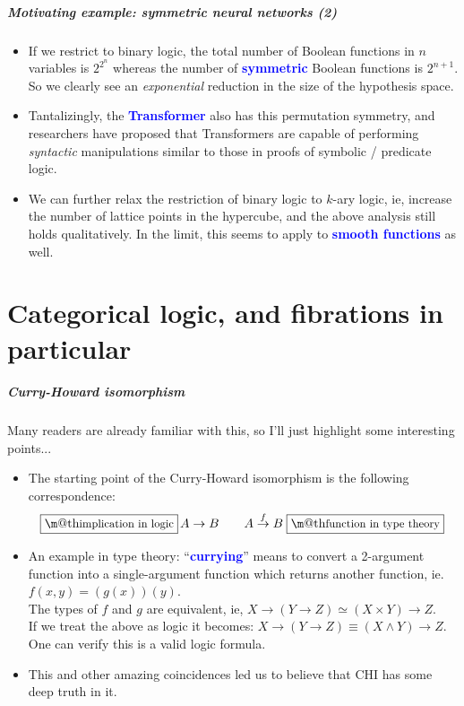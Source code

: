 \documentclass[16pt]{beamer}
\makeatletter
\let\oldtextbf\textbf
\renewcommand{\textbf}[1]{\textcolor{blue}{\oldtextbf{#1}}}
\renewcommand{\boxed}[1]{\fbox{\m@th$\displaystyle\scalebox{0.9}{#1}$} \,}
\makeatother
\begin{document}
\begin{frame}
	\frametitle{Motivating example: symmetric neural networks (2)}
	\begin{itemize}
		\item If we restrict to binary logic, the total number of Boolean functions in $n$ variables is $2^{2^n}$ whereas the number of \textbf{symmetric} Boolean functions is $2^{n+1}$.  So we clearly see an \textit{exponential} reduction in the size of the hypothesis space.
		
		\item Tantalizingly, the \textbf{Transformer} also has this permutation symmetry, and researchers have proposed that Transformers are capable of performing \textit{syntactic} manipulations similar to those in proofs of symbolic / predicate logic.
		
		\item We can further relax the restriction of binary logic to $k$-ary logic, ie, increase the number of lattice points in the hypercube, and the above analysis still holds qualitatively.  In the limit, this seems to apply to \textbf{smooth functions} as well.
	\end{itemize}
\end{frame}

\part{Categorical logic, and fibrations in particular}
\frame{\partpage}

\begin{frame}
\frametitle{Curry-Howard isomorphism}
Many readers are already familiar with this, so I'll just highlight some interesting points...
\begin{itemize}
	\item The starting point of the Curry-Howard isomorphism is the following correspondence:
	\begin{equation}
		\boxed{implication in logic} A \rightarrow B \qquad A \stackrel{f}{\rightarrow} B \; \boxed{function in type theory}
		\nonumber
	\end{equation}
	\item An example in type theory: ``\textbf{currying}'' means to convert a 2-argument function into a single-argument function which returns another function, ie. $f(x,y) = (g(x))(y)$.  \\
	The types of $f$ and $g$ are equivalent, ie, $X \rightarrow (Y \rightarrow Z) \simeq (X \times Y) \rightarrow Z$. \\
	If we treat the above as logic it becomes: $X \rightarrow (Y \rightarrow Z) \equiv (X \wedge Y) \rightarrow Z$.  One can verify this is a valid logic formula.
	\item This and other amazing coincidences led us to believe that CHI has some deep truth in it.
\end{itemize}
\end{frame}
\end{document}
